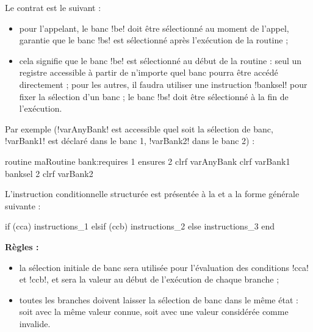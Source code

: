 
Le contrat est le suivant :
\begin{itemize}
  \item pour l'appelant, le banc \pic!be! doit être sélectionné au moment de l'appel, garantie que le banc \pic!bs! est sélectionné après l'exécution de la routine ; 
  \item cela signifie que le banc \pic!be! est sélectionné au début de la routine : seul un registre accessible à partir de n'importe quel banc pourra être accédé directement ; pour les autres, il faudra utiliser une instruction \pic!banksel! pour fixer la sélection d'un banc ; le banc \pic!bs! doit être sélectionné à la fin de l'exécution.
\end{itemize}

Par exemple (\pic!varAnyBank! est accessible quel soit la sélection de banc, \pic!varBank1! est déclaré dans le banc 1, \pic!varBank2! dans le banc 2) :
\begin{piccolo}
routine maRoutine bank:requires 1 ensures 2 {
  clrf varAnyBank
  clrf varBank1
  banksel 2
  clrf varBank2
}
\end{piccolo}










L'instruction conditionnelle structurée est présentée à la  et a la forme générale suivante :

\begin{piccolo}
if (cca)
  instructions_1
elsif (ccb)
  instructions_2
else
  instructions_3
end
\end{piccolo}

\textbf{Règles :}
\begin{itemize}
  \item la sélection initiale de banc sera utilisée pour l’évaluation des conditions \pic!cca! et \pic!ccb!, et sera la valeur au début de l'exécution de chaque branche ;
  \item toutes les branches doivent laisser la sélection de banc dans le même état : soit avec la même valeur connue, soit avec une valeur considérée comme invalide.
\end{itemize}


